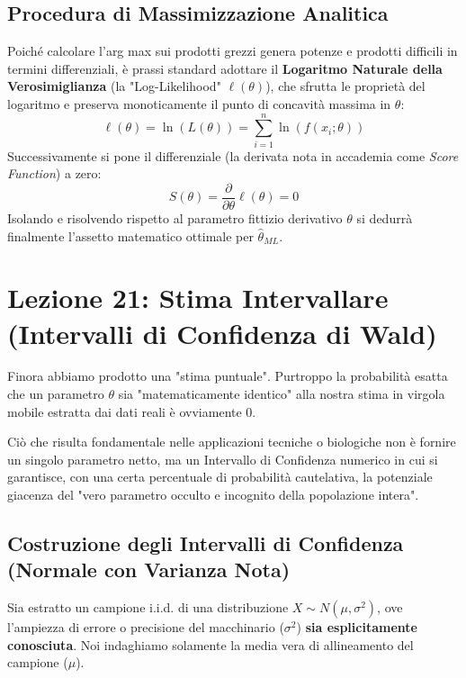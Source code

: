 \documentclass[12pt, a4paper]{article}
\begin{document}
\subsection{Procedura di Massimizzazione Analitica}
Poiché calcolare l'arg max sui prodotti grezzi genera potenze e prodotti difficili in termini differenziali, è prassi standard adottare il \textbf{Logaritmo Naturale della Verosimiglianza} (la "Log-Likelihood" $\ell(\theta)$), che sfrutta le proprietà del logaritmo e preserva monoticamente il punto di concavità massima in $\theta$:
$$ \ell(\theta) = \ln(L(\theta)) = \sum_{i=1}^n \ln(f(x_i; \theta)) $$
Successivamente si pone il differenziale (la derivata nota in accademia come \textit{Score Function}) a zero:
$$ S(\theta) = \frac{\partial}{\partial\theta} \ell(\theta) = 0 $$
Isolando e risolvendo rispetto al parametro fittizio derivativo $\theta$ si dedurrà finalmente l'assetto matematico ottimale per $\hat{\theta}_{ML}$.


\newpage

\section{Lezione 21: Stima Intervallare (Intervalli di Confidenza di Wald)}

Finora abbiamo prodotto una "stima puntuale". Purtroppo la probabilità esatta che un parametro $\theta$ sia "matematicamente identico" alla nostra stima in virgola mobile estratta dai dati reali è ovviamente 0. 

Ciò che risulta fondamentale nelle applicazioni tecniche o biologiche non è fornire un singolo parametro netto, ma un Intervallo di Confidenza numerico in cui si garantisce, con una certa percentuale di probabilità cautelativa, la potenziale giacenza del "vero parametro occulto e incognito della popolazione intera".

\subsection{Costruzione degli Intervalli di Confidenza (Normale con Varianza Nota)}
Sia estratto un campione i.i.d. di una distribuzione $X \sim N(\mu, \sigma^2)$, ove l'ampiezza di errore o precisione del macchinario ($\sigma^2$) \textbf{sia esplicitamente conosciuta}. Noi indaghiamo solamente la media vera di allineamento del campione ($\mu$).
\end{document}
